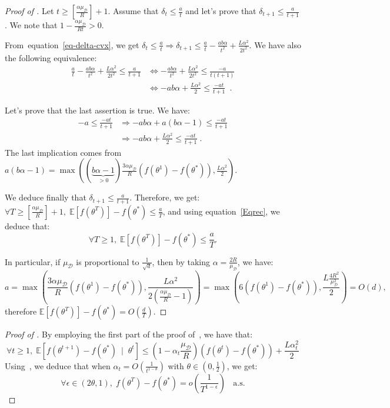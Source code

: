 \documentclass{article} %
\def\eqref#1{equation~\ref{#1}}
\begin{document}
\begin{proof}[Proof of ]
Let $t \ge [\frac{\alpha \mu_{\mathcal{D}} }{R}]+1$.  Assume that $\delta_t \le \frac{ a}{t }$ and let's prove that  $\delta_{t+1}\le \frac{a}{t+1}$. We note that $1-  \frac{\alpha \mu_{\mathcal{D}}}{ R t}>0$. 

From~\eqref{eq-delta-cvx}, we get 
$
 \delta_{t} \le \frac{a}{t} \Longrightarrow   \delta_{t+1} \le \frac{a}{t}-\frac{ab\alpha}{t^2}+\frac{L \alpha^2 }{2 t^2}$. 
We have also the following equivalence:
\begin{align*}
\frac{a}{t}-\frac{ab\alpha}{t^2}+\frac{L  \alpha^2}{2  t^2}   \le \frac{a}{t+1} &\Longleftrightarrow -\frac{a b\alpha}{t^2}+\frac{L \alpha^2 }{2  t^2}  \le \frac{-a}{t(t+1)}
\\
&\Longleftrightarrow -ab\alpha +\frac{L \alpha^2}{2 } \le \frac{-at}{t+1}\enspace.
\end{align*}

Let's prove that the last assertion is true. We have: 
\begin{align*}
    -a \le \frac{-at}{t+1} &\Longrightarrow -ab\alpha+a(b \alpha-1)\le  \frac{-at}{t+1}\\
    &\Longrightarrow -ab\alpha+\frac{L \alpha^2}{2 }\le  \frac{-at}{t+1}\;.
\end{align*}
The last implication comes from $a(b \alpha-1)=\max\left((\underbrace{b\alpha-1}_{>0})  \frac{3\alpha \mu_{\mathcal{D}} }{R}(f(\theta^1)-f(\theta^{*})), \frac{L \alpha^2}{2 }   \right)$.

We deduce finally that $\delta_{t+1} \le \frac{a}{t+1}$. Therefore, we get: $\forall T \ge [\frac{\alpha \mu_{\mathcal{D}} }{R}]+1,\;  \mathbb{E}[f(\theta^T)]-f(\theta^{*}) \le \frac{a}{T}$, 
and using \eqref{Eqrec}, we deduce that: $$\forall T \ge 1,\;  \mathbb{E}[f(\theta^T)]-f(\theta^{*}) \le \frac{a}{T}.$$

In particular, if $\mu_{\mathcal{D}}$ is proportional to $\frac{1}{\sqrt{d}}$, then by taking  $\alpha=\frac{2R}{\mu_{\mathcal{D}}}$, we have: $$a=\max( \frac{3\alpha \mu_{\mathcal{D}} }{R}(f(\theta^1)-f(\theta^{*})), \frac{L \alpha^2 }{2( \frac{\alpha \mu_{ \mathcal{D}} }{R}-1 ) })=\max ( 6(f(\theta^1)-f(\theta^{*})),   \frac{L\frac{4R^2}{\mu_{\mathcal{D}}^2} }{2})=O(d),$$
therefore $\mathbb{E}[f(\theta^T)]-f(\theta^{*})=O(\frac{d}{T})$.
\end{proof}

\begin{proof}[Proof of ]

By employing the first part of the proof of~, we have that:
$$\forall t \ge 1,\;  \mathbb{E}[f(\theta^{t+1})-f(\theta^{*}) \: \mid \; \theta^t  ] \le \left( 1- \alpha_t \frac{\mu_{\mathcal{D}}}{ R}  \right) \left(f(\theta^{t})-f(\theta^{*})\right)+ \frac{L \alpha_t^2  }{2}$$
Using~, we deduce that when $\alpha_t=O(\frac{1}{t^{1-\theta}})$ with $\theta \in (0,\frac{1}{2})$, we get: 
$$\forall \epsilon \in (2\theta,1),\; f(\theta^T)-f(\theta^{*})=o(\frac{1}{T^{1-\epsilon}}) \;\;\text{ a.s.}$$
\end{proof}
\end{document}
